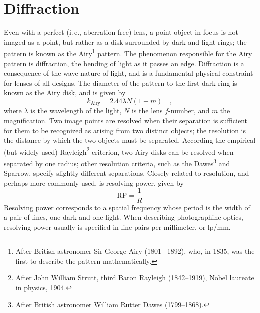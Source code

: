 \documentclass[11pt, oneside]{scrartcl}   	%
\begin{document}
\section{Diffraction}
\label{sec:diffraction}


Even with a perfect (i.\,e., aberration-free) lens, a point object in
focus is not imaged as a point, but rather as a disk surrounded by
dark and light rings; the pattern is known as the Airy\footnote{After
  British astronomer Sir George Airy (1801–-1892), who, in 1835, was
  the first to describe the pattern mathematically.} pattern. The
phenomenon responsible for the Airy pattern is diffraction, the
bending of light as it passes an edge. Diffraction is a consequence of
the wave nature of light, and is a fundamental physical constraint for
lenses of all designs. The diameter of the pattern to the first dark
ring is known as the Airy disk, and is given by
\begin{equation}
  \label{eq:airy}
   k_\mathrm{Airy} = 2.44\lambda N(1+m)\quad,
\end{equation}
where $\lambda$ is the wavelength of the light, $N$ is the lens
$f$-number, and $m$ the magnification. Two image points are resolved
when their separation is sufficient for them to be recognized as
arising from two distinct objects; the resolution is the distance by
which the two objects must be separated. According the empirical (but
widely used) Rayleigh\footnote{After John William Strutt, third Baron
  Rayleigh (1842–1919), Nobel laureate in physics, 1904.} criterion,
two Airy disks can be resolved when separated by one radius; other
resolution criteria, such as the Dawes\footnote{After British
  astronomer William Rutter Dawes (1799–1868).} and Sparrow, specify
slightly different separations. Closely related to resolution, and
perhaps more commonly used, is resolving power, given by
\begin{equation}
  \label{eq:respow}
  \mathrm{RP} = \frac 1 R
\end{equation}
Resolving power corresponds to a spatial frequency whose period is the width of a pair of lines, one dark and one light. When describing photographihc optics, resolving power usually is specified in line pairs per millimeter, or lp/mm.
\end{document}
